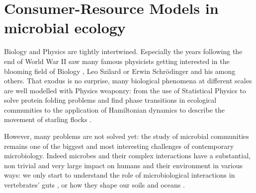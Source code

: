 \documentclass[12pt, titlepage]{report}
\begin{document}
\section[CRMs in microbial ecology]{Consumer-Resource
 Models in microbial ecology}

Biology and Physics are tightly intertwined. Especially the years following the end of World War II saw many famous physicists getting interested in the blooming field of Biology \cite{jogalekar_physicists_nodate}, Leo Szilard or Erwin Schr\"odinger and his  \cite{schrodinger_what_1944} among others. That exodus is no surprise, many biological phenomena at different scales are well modelled with Physics weaponry: from the use of Statistical Physics to solve protein folding problems \cite{chan_protein_1993} and find phase transitions in ecological communities \cite{fisher_transition_2014} to the application of Hamiltonian dynamics to describe the movement of starling flocks \cite{attanasi_information_2014}.


However, many problems are not solved yet: the study of microbial communities remains one of the biggest and most interesting challenges of contemporary microbiology. Indeed microbes and their complex interactions have a substantial, non trivial and very large impact on humans and their environment in various ways: we only start to understand the role of microbiological interactions in vertebrates' guts \cite{ley_worlds_2008}, or how they shape our soils \cite{becerra-castro_wastewater_2015} and oceans \cite{falkowski_biogeochemical_1998}.
\end{document}
